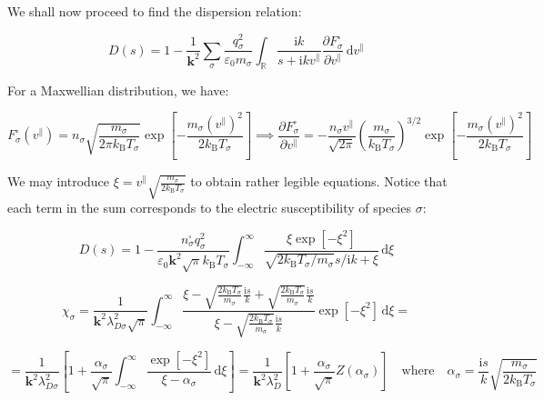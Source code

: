 \quad We shall now proceed to find the dispersion relation:

\begin{equation}
    \label{eq-4-147}
    D(s)=1-\frac{1}{\mathbf{k}^2}\sum_{\sigma}\frac{q_\sigma^2}{\varepsilon_0m_\sigma}\int_{\mathbb{R}}\frac{\mathrm{i}k}{s+\mathrm{i}kv^\parallel}\frac{\partial F_\sigma^\square}{\partial v^\parallel}\,\mathrm{d}v^\parallel
\end{equation}

For a Maxwellian distribution, we have:

\begin{equation}
    F_\sigma^\square(v^\parallel)=n_\sigma\sqrt{\frac{m_\sigma}{2\pi k_\mathrm{B}T_\sigma}}\exp{\left[-\frac{m_\sigma(v^\parallel)^2}{2k_\mathrm{B}T_\sigma}\right]}\implies\frac{\partial F_\sigma^\square}{\partial v^\parallel}=-\frac{n_\sigma v^\parallel}{\sqrt{2\pi}}\left(\frac{m_\sigma}{k_\mathrm{B}T_\sigma}\right)^{3/2}\exp{\left[-\frac{m_\sigma(v^\parallel)^2}{2k_\mathrm{B}T_\sigma}\right]}
\end{equation}

We may introduce $\xi=v^\parallel\sqrt{\frac{m_\sigma}{2k_\mathrm{B}T_\sigma}}$ to obtain rather legible equations. Notice that each term in the sum corresponds to the electric susceptibility of species $\sigma$:

\begin{equation}
    D(s)=1-\frac{n_\sigma^\square q_\sigma^2}{\varepsilon_0\mathbf{k}^2\sqrt{\pi}k_\mathrm{B}T_\sigma}\int_{-\infty}^\infty\frac{\xi\exp{\left[-\xi^2\right]}}{\sqrt{2k_\mathrm{B}T_\sigma/m_\sigma}s/\mathrm{i}k+\xi}\,\mathrm{d}\xi
\end{equation}

\begin{equation}
    \chi_\sigma=\frac{1}{\mathbf{k}^2\lambda_{D\sigma}^2\sqrt{\pi}}\int_{-\infty}^\infty\frac{\xi-\sqrt{\frac{2k_\mathrm{B}T_\sigma}{m_\sigma}}\frac{\mathrm{i}s}{k}+\sqrt{\frac{2k_\mathrm{B}T_\sigma}{m_\sigma}}\frac{\mathrm{i}s}{k}}{\xi-\sqrt{\frac{2k_\mathrm{B}T_\sigma}{m_\sigma}}\frac{\mathrm{i}s}{k}}\exp{\left[-\xi^2\right]}\,\mathrm{d}\xi=
\end{equation}

\begin{equation}
    =\frac{1}{\mathbf{k}^2\lambda_{D\sigma}^2}\left[1+\frac{\alpha_\sigma}{\sqrt{\pi}}\int_{-\infty}^\infty\frac{\exp{\left[-\xi^2\right]}}{\xi-\alpha_\sigma}\,\mathrm{d}\xi\right]=\frac{1}{\mathbf{k}^2\lambda_D^2}\left[1+\frac{\alpha_\sigma}{\sqrt{\pi}}Z(\alpha_\sigma)\right]\quad\text{where}\quad\alpha_\sigma=\frac{\mathrm{i}s}{k}\sqrt{\frac{m_\sigma}{2k_\mathrm{B}T_\sigma}}
\end{equation}


